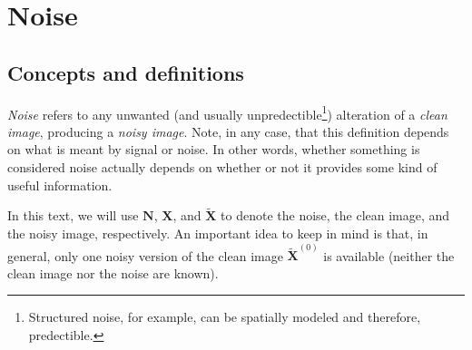 \chapter{Noise}

\section{Concepts and definitions}

\emph{Noise} refers to any unwanted (and usually
unpredectible\footnote{Structured noise, for example, can be spatially
  modeled and therefore, predectible.}) alteration of a \emph{clean
  image}, producing a \emph{noisy image}. Note, in any case, that this
definition depends on what is meant by signal or noise. In other
words, whether something is considered noise actually depends on
whether or not it provides some kind of useful information.

In this text, we will use $\bm{N}$, $\bm{X}$, and $\tilde{\bm{X}}$ to
denote the noise, the clean image, and the noisy image,
respectively. An important idea to keep in mind is that, in general,
only one noisy version of the clean image $\tilde{\bm{X}}^{(0)}$ is
available (neither the clean image nor the noise are known).

